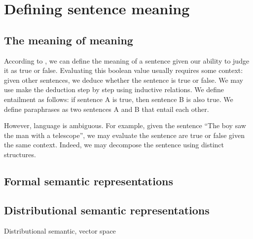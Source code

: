 \setchapterpreamble[u]{\margintoc}
\chapter{Defining sentence meaning}


\section{The meaning of meaning}

According to \textcite{fromkin_2017}, we can define the meaning of a sentence given our ability to judge it as true or false. Evaluating this boolean value usually requires some context: given other sentences, we deduce whether the sentence is true or false. We may use make the deduction step by step using inductive relations. We define entailment as follows: if sentence A is true, then sentence B is also true. We define paraphrases as two sentences A and B that entail each other.

However, language is ambiguous. For example, given the sentence “The boy saw the man with a telescope”, we may evaluate the sentence are true or false given the same context. Indeed, we may decompose the sentence using distinct structures.

\section{Formal semantic representations}

\section{Distributional semantic representations}

Distributional semantic, vector space